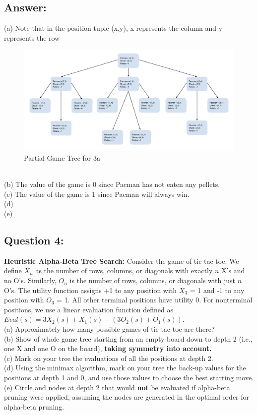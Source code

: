 \documentclass{article}
\begin{document}
\subsection*{Answer:}
(a) Note that in the position tuple (x,y), x represents the column and y represents the row
\begin{figure}[h]
    \centering
    \includegraphics[width=1\textwidth]{part3a.png}
    \caption{Partial Game Tree for 3a}
    \label{fig:sample}
\end{figure}
\\
(b) The value of the game is 0 since Pacman has not eaten any pellets.
\\
(c) The value of the game is 1 since Pacman will always win.
\\
(d) 
\\
(e)


\subsection*{Question 4:}
\textbf{Heuristic Alpha-Beta Tree Search:} Consider the game of tic-tac-toe. We
define $X_n$ as the number of rows, columns, or diagonals with exactly $n $ X's and no O's. Similarly, $O_n$ is the number of rows, columns, or diagonals with just $n$ O's. The utility function assigns +1 to any position with $X_3$ = 1 and -1 to any position with $O_3$ = 1. All other terminal positions have utility 0. For nonterminal positions, we use a linear evaluation function defined as $Eval(s) = 3X_2(s) + X_1(s) - (3O_2(s) + O_1(s))$.
\\
(a) Approximately how many possible games of tic-tac-toe are there?
\\
(b) Show of whole game tree starting from an empty board down to depth 2 (i.e., one X
and one O on the board), \textbf{taking symmetry into account.}
\\
(c) Mark on your tree the evaluations of all the positions at depth 2.
\\
(d) Using the minimax algorithm, mark on your tree the back-up values for the positions at depth 1 and 0, and use those values to choose the best starting move.
\\
(e) Circle and nodes at depth 2 that would \textbf{not} be evaluated if alpha-beta pruning were applied, assuming the nodes are generated in the optimal order for alpha-beta pruning.
\end{document}
